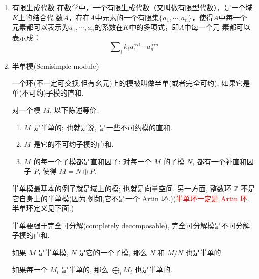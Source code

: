 \documentclass{ctexart}
\newtheorem*{thm}{定理}
\begin{document}
\begin{enumerate}
\begin{thm}
令$A, B$为$R\text{-}$代数，则$A \otimes_R B$具有通常的$R\text{-}$模结构，
并且可定义乘法$(a\otimes b)(a' \otimes b') = (aa) \otimes (bb')$，使得
它成为一个$R\text{-}$代数。
\end{thm}

\begin{thm}
\begin{align*}
A \to A \otimes_R B\\
a \mapsto a \otimes 1_B\\
B \to A \otimes_R B\\
b \mapsto 1_A \otimes b
\end{align*}
这两个映射使得张量积在交换$R\text{-}$代数范畴中成为$coproduct$。但是张
量积在所有$R\text{-}$代数范畴中并不是$coproduct$。
\end{thm}

\item 有限生成代数\cite{finitely_generated_algebra}
在数学中，一个有限生成代数（又叫做有限型代数），是一个域$K$上的结合代
数$A$，存在$A$中元素的一个有限集$\{a_1,\cdots,a_n\}$，使得$A$中每一个
元素都可以表示为$a_1,\cdots,a_n$的系数在$K$中的多项式，即$A$中每一个元
素都可以表示成：
\[
\sum\nolimits_ik_ia_1^{\alpha i1}\cdots a_n^{\alpha in}
\]

\item 半单模(Semisimple module)\cite{semisimple_module}

一个环(不一定可交换,但有幺元)上的模被叫做半单(或者完全可约), 如果它是单(不可约)子模的直和.

对一个模 $M$, 以下陈述等价:
\begin{enumerate}
  \item $M$ 是半单的; 也就是说, 是一些不可约模的直和.
  \item $M$ 是它的不可约子模的直和.
  \item $M$ 的每一个子模都是直和因子: 对每一个 $M$ 的子模 $N$, 都有一个补直和因子 $P$, 使得 $M = N \oplus P$.
\end{enumerate}

半单模最基本的例子就是域上的模; 也就是向量空间. 另一方面, 整数环 $\mathbb{Z}$ 不是它自身上的半单模(因为,例如,它不是一个 Artin 环.)(\textcolor{red}{半单环一定是 Artin 环}. 半单环定义见下面.)

半单要强于完全可分解(completely decomposable), 完全可分解模是不可分解子模的直和.

如果 $M$ 是半单模, $N$ 是它的一个子模, 那么 $N$ 和 $M/N$ 也是半单的.

如果每一个 $M_i$ 是半单的, 那么 $\underset{i}{\bigoplus}M_i$ 也是半单的.


\end{enumerate}
\end{document}
